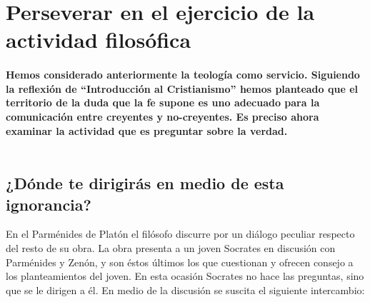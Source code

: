 \documentclass[10pt]{article}
\begin{document}
\section{Perseverar en el ejercicio de la actividad filosófica}
  \paragraph{Hemos considerado anteriormente la teología como servicio. Siguiendo
    la reflexión de ``Introducción al Cristianismo'' hemos planteado que el
    territorio de la duda que la fe supone es uno adecuado para la comunicación
    entre creyentes y no-creyentes. Es preciso ahora examinar la actividad que es
    preguntar sobre la verdad.\\\\}

  \subsection{¿Dónde te dirigirás en medio de esta ignorancia?}
  En el Parménides de Platón el filósofo discurre por un diálogo peculiar respecto
  del resto de su obra. La obra presenta a un joven Socrates en discusión con
  Parménides y Zenón, y son éstos últimos los que cuestionan y ofrecen consejo a
  los planteamientos del joven. En esta ocasión Socrates no hace las preguntas,
  sino que se le dirigen a él. En medio de la discusión se suscita el siguiente
  intercambio:
\end{document}
